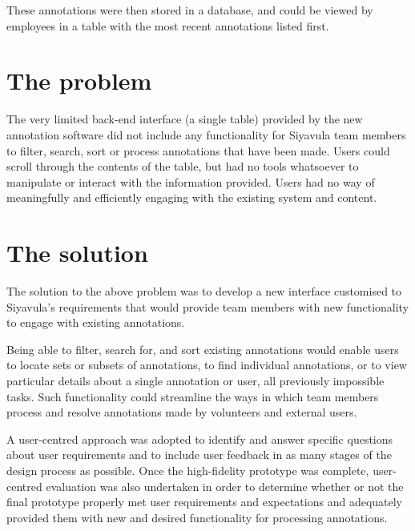 These annotations were then stored in a database, and could be viewed by employees in a table  with the most recent annotations listed first. 

\section{The problem}
The very limited back-end interface (a single table) provided by the new annotation software did not include any functionality for Siyavula team members to filter, search, sort or process annotations that have been made. Users could scroll through the contents of the table, but had no tools whatsoever to manipulate or interact with the information provided. Users had no way of meaningfully and efficiently engaging with the existing system and content.




\section{The solution}
The solution to the above problem was to develop a new interface customised to Siyavula's requirements that would provide team members with new functionality to engage with existing annotations. 

Being able to filter, search for, and sort existing annotations would enable users to locate sets or subsets of annotations, to find individual annotations, or to view particular details about a single annotation or user, all previously impossible tasks. Such functionality could streamline the ways in which team members process and resolve annotations made by volunteers and external users.

A user-centred approach was adopted to identify and answer specific questions about user requirements and to include user feedback in as many stages of the design process as possible. Once the high-fidelity prototype was complete, user-centred evaluation was also undertaken in order to determine whether or not the final prototype properly met user requirements and expectations and adequately provided them with new and desired functionality for processing annotations. 

